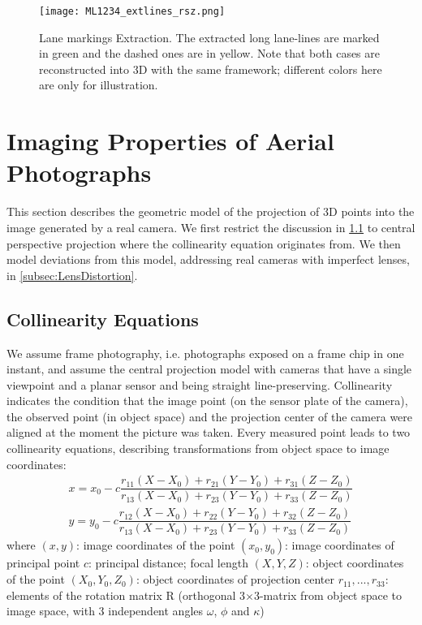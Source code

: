\begin{figure}
  \centering
  \texttt{[image: ML1234\_extlines\_rsz.png]}
  \caption{\small Lane markings Extraction. The extracted long lane-lines are marked in green and the dashed ones are in yellow.  Note that both cases are reconstructed into 3D with the same framework; different colors here are only for illustration.}
  \label{fig:LineExtraction}
\end{figure}


\clearpage
\section{Imaging Properties of Aerial Photographs}
\label{sec:Geometry}

This section describes the geometric model of the projection of 3D points into the image generated by a real camera. We first restrict the discussion in \cref{subsec:Collinearity} to central perspective projection where the collinearity equation originates from. We then model deviations from this model, addressing real cameras with imperfect lenses, in \cref{subsec:LensDistortion}.

\subsection{Collinearity Equations}
\label{subsec:Collinearity}
We assume frame photography, i.e. photographs exposed on a frame chip in one instant, and assume the central projection model with cameras that have a single viewpoint and a planar sensor and being straight line-preserving. Collinearity indicates the condition that the image point (on the sensor plate of the camera), the observed point (in object space) and the projection center of the camera were aligned at the moment the picture was taken. Every measured point leads to two collinearity equations, describing transformations from object space to image coordinates:
\begin{equation} \label{eq:collinearity}
\begin{split}
x = x_0 -c \dfrac {r_{11}(X-X_0) + r_{21}(Y-Y_0) + r_{31}(Z-Z_0)} {r_{13}(X-X_0) + r_{23}(Y-Y_0) + r_{33}(Z-Z_0)} \\
y = y_0 -c \dfrac {r_{12}(X-X_0) + r_{22}(Y-Y_0) + r_{32}(Z-Z_0)} {r_{13}(X-X_0) + r_{23}(Y-Y_0) + r_{33}(Z-Z_0)}
\end{split}
\end{equation}
where\newline
$(x, y)$: image coordinates of the point \newline
$(x_0, y_0)$: image coordinates of principal point \newline
$c$: principal distance; focal length \newline
$(X, Y, Z)$: object coordinates of the point \newline
$(X_0, Y_0, Z_0)$: object coordinates of projection center \newline
$r_{11},...,r_{33}$: elements of the rotation matrix R (orthogonal 3$\times$3-matrix from object space to image space, with 3 independent angles $\omega$, $\phi$ and $\kappa$)

